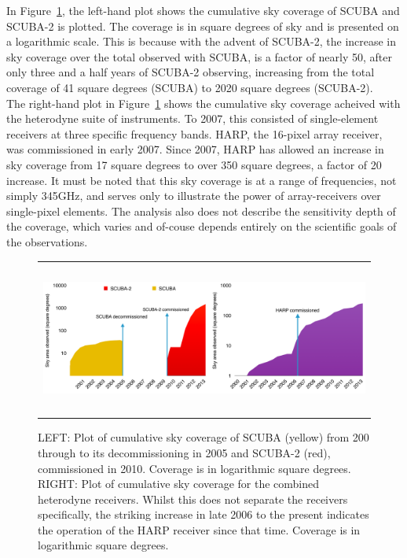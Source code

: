 \documentclass[]{spie}  %
\begin{document}
In Figure~\ref{fig:sc2}, the left-hand plot shows the cumulative sky coverage of
SCUBA and SCUBA-2 is plotted. The coverage is in square degrees of sky
and is presented on a logarithmic scale. This is because with the
advent of SCUBA-2, the increase in sky coverage over the total
observed with SCUBA, is a factor of nearly 50, after only three and a
half years of SCUBA-2 observing, increasing from the total coverage of
41 square degrees (SCUBA) to 2020 square degrees (SCUBA-2).\\

The right-hand plot in Figure~\ref{fig:sc2} shows the cumulative sky coverage acheived with
the heterodyne suite of instruments. To 2007, this consisted of
single-element receivers at three specific frequency bands. HARP, the
16-pixel array receiver, was commissioned in early 2007. Since 2007,
HARP has allowed an increase in sky coverage from 17 square degrees to
over 350 square degrees, a factor of 20 increase. It must be noted
that this sky coverage is at a range of frequencies, not simply
345GHz, and serves only to illustrate the power of array-receivers
over single-pixel elements. The analysis also does not describe the
sensitivity depth of the coverage, which varies and of-couse depends
entirely on the scientific goals of the observations.

\begin{figure}[h]
   \begin{center}
   \begin{tabular}{c}
   \includegraphics[height=5cm]{jcmt_cumulativearea}
   \end{tabular}
   \end{center}
   \caption{\label{fig:sc2} LEFT: Plot of cumulative sky coverage of SCUBA (yellow) from 200 through to its decommissioning in 2005 and SCUBA-2 (red), commissioned in 2010. Coverage is in logarithmic square degrees. RIGHT: Plot of cumulative sky coverage for the combined heterodyne receivers. Whilst this does not separate the receivers specifically, the striking increase in late 2006 to the present indicates the operation of the HARP receiver since that time. Coverage is in logarithmic square degrees.}
\end{figure}
\end{document}
